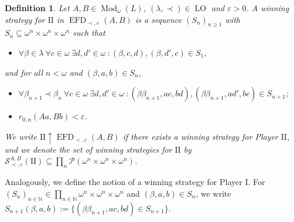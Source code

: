 \documentclass[12pt]{amsart}
\newtheorem{definition}[theorem]{Definition}
\DeclareMathOperator{\EFD}{EFD}
\DeclareMathOperator{\Mod}{Mod}
\DeclareMathOperator{\LO}{LO}
\begin{document}
\begin{definition}\label{definition: metric EFD winning strategy for II}
    Let $A,B\in \Mod_\omega(L)$, $(\lambda,\prec)\in\LO$ and $\varepsilon>0$. A winning strategy for $\mathrm{II}$ in $\EFD_{\prec,\varepsilon}(A,B)$ is a sequence $(S_n)_{n\geq 1}$ with $S_n\subseteq \omega^n\times\omega^n\times\omega^n$ such that 
    \begin{itemize}
        \item $\forall \beta\in\lambda\ \forall c\in\omega \ \exists d,d'\in\omega ~\colon (\beta,c,d),(\beta,d',c)\in S_1$,
    \end{itemize}
    and for all $n<\omega$ and $(\beta,a,b)\in S_n$,
    \begin{itemize}
        \item $\forall \beta_{n+1}\prec\beta_n\ \forall c\in \omega\ \exists d,d'\in\omega ~\colon (\beta\beta_{n+1},ac,bd),(\beta\beta_{n+1},ad',bc)\in S_{n+1}$;
        \item $r_{0,n}(Aa,Bb)<\varepsilon$.
    \end{itemize}
    We write $\mathrm{II} \uparrow\EFD_{\prec,\varepsilon}(A,B)$ if there exists a winning strategy for Player $\mathrm{II}$, and we denote the set of winning strategies for $\mathrm{II}$ by $\mathcal{S}_{\prec,\varepsilon}^{A,B}(\mathrm{II})\subseteq \prod_n\mathcal{P}(\omega^n\times\omega^n\times\omega^n)$.
\end{definition}

Analogously, we define the notion of a winning strategy for Player I. For $(S_n)_{n\in\mathbb N}\in \prod_{n\in\mathbb N}\omega^n\times\omega^n\times\omega^n$ and $(\beta,a,b)\in S_n$, we write $S_{n+1}(\beta,a,b):=\{(\beta\beta_{n+1},ac,bd)\in S_{n+1}\}$.
\end{document}
